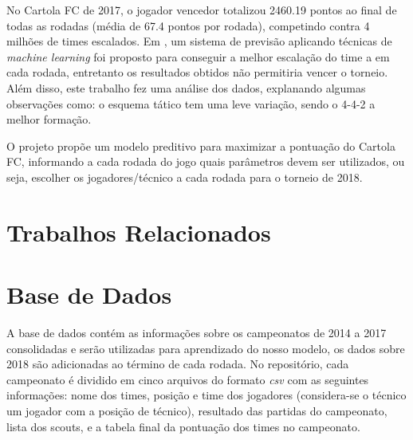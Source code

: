\documentclass[conference]{IEEEtran}
\newcommand{\tit}[1]{{\textit{#1}}}
\begin{document}
No  Cartola  FC   de  2017,  o  jogador   vencedor  totalizou  2460.19
pontos  ao final  de  todas  as rodadas  (média  de  67.4 pontos  por
rodada),  competindo   contra  4  milhões  de   times  escalados.  Em
\cite{viscondiaplicacao}, um sistema  de previsão aplicando técnicas
de  \tit{machine  learning}  foi  proposto  para  conseguir  a  melhor
escalação do time a em cada rodada, entretanto os resultados obtidos
não permitiria vencer  o torneio. Além disso, este  trabalho fez uma
análise dos  dados, explanando algumas observações  como: o esquema
tático tem uma leve variação, sendo o 4-4-2 a melhor formação.

O projeto propõe um modelo  preditivo para maximizar a pontuação do
Cartola FC, informando  a cada rodada do jogo  quais parâmetros devem
ser utilizados, ou seja, escolher  os jogadores/técnico a cada rodada
para o torneio de 2018.

\section{Trabalhos Relacionados}

\section{Base de Dados}

A base de  dados \cite{git_cartola} contém as  informações sobre os
campeonatos  de 2014  a  2017 consolidadas  e  serão utilizadas  para
aprendizado do nosso  modelo, os dados sobre 2018  são adicionadas ao
término de cada rodada. No  repositório, cada campeonato é dividido
em cinco arquivos do formato \tit{csv} com as seguintes informações:
nome  dos  times,  posição  e time  dos  jogadores  (considera-se  o
técnico  um  jogador com  a  posição  de técnico),  resultado  das
partidas  do  campeonato,  lista  dos  scouts, e  a  tabela  final  da
pontuação dos times no campeonato.
\end{document}
